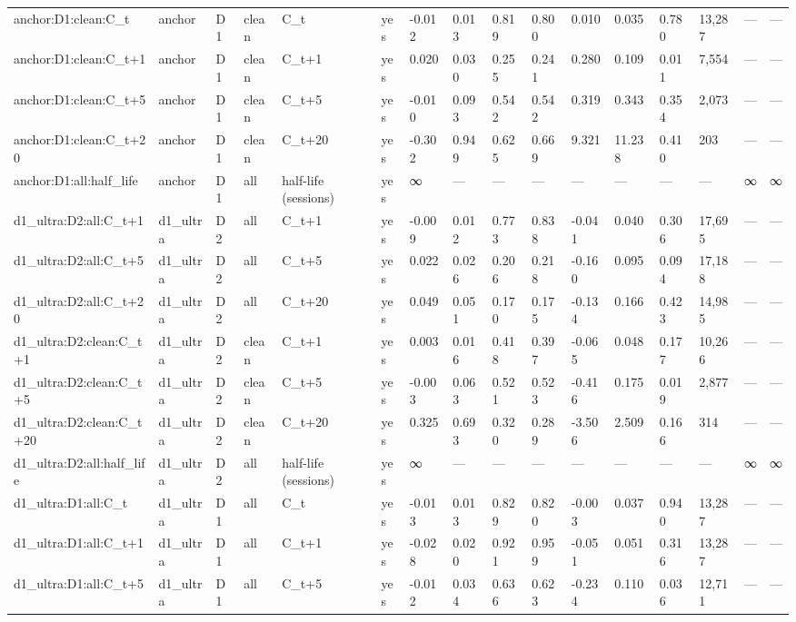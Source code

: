 \begin{tabular}{llllllllllllllll}
anchor:D1:clean:C\_t & anchor & D1 & clean & C\_t & yes & -0.012 & 0.013 & 0.819 & 0.800 & 0.010 & 0.035 & 0.780 & 13,287 & — & — \\
anchor:D1:clean:C\_t+1 & anchor & D1 & clean & C\_t+1 & yes & 0.020 & 0.030 & 0.255 & 0.241 & 0.280 & 0.109 & 0.011 & 7,554 & — & — \\
anchor:D1:clean:C\_t+5 & anchor & D1 & clean & C\_t+5 & yes & -0.010 & 0.093 & 0.542 & 0.542 & 0.319 & 0.343 & 0.354 & 2,073 & — & — \\
anchor:D1:clean:C\_t+20 & anchor & D1 & clean & C\_t+20 & yes & -0.302 & 0.949 & 0.625 & 0.669 & 9.321 & 11.238 & 0.410 & 203 & — & — \\
anchor:D1:all:half\_life & anchor & D1 & all & half-life (sessions) & yes & ∞ & — & — & — & — & — & — & — & ∞ & ∞ \\
d1\_ultra:D2:all:C\_t+1 & d1\_ultra & D2 & all & C\_t+1 & yes & -0.009 & 0.012 & 0.773 & 0.838 & -0.041 & 0.040 & 0.306 & 17,695 & — & — \\
d1\_ultra:D2:all:C\_t+5 & d1\_ultra & D2 & all & C\_t+5 & yes & 0.022 & 0.026 & 0.206 & 0.218 & -0.160 & 0.095 & 0.094 & 17,188 & — & — \\
d1\_ultra:D2:all:C\_t+20 & d1\_ultra & D2 & all & C\_t+20 & yes & 0.049 & 0.051 & 0.170 & 0.175 & -0.134 & 0.166 & 0.423 & 14,985 & — & — \\
d1\_ultra:D2:clean:C\_t+1 & d1\_ultra & D2 & clean & C\_t+1 & yes & 0.003 & 0.016 & 0.418 & 0.397 & -0.065 & 0.048 & 0.177 & 10,266 & — & — \\
d1\_ultra:D2:clean:C\_t+5 & d1\_ultra & D2 & clean & C\_t+5 & yes & -0.003 & 0.063 & 0.521 & 0.523 & -0.416 & 0.175 & 0.019 & 2,877 & — & — \\
d1\_ultra:D2:clean:C\_t+20 & d1\_ultra & D2 & clean & C\_t+20 & yes & 0.325 & 0.693 & 0.320 & 0.289 & -3.506 & 2.509 & 0.166 & 314 & — & — \\
d1\_ultra:D2:all:half\_life & d1\_ultra & D2 & all & half-life (sessions) & yes & ∞ & — & — & — & — & — & — & — & ∞ & ∞ \\
d1\_ultra:D1:all:C\_t & d1\_ultra & D1 & all & C\_t & yes & -0.013 & 0.013 & 0.829 & 0.820 & -0.003 & 0.037 & 0.940 & 13,287 & — & — \\
d1\_ultra:D1:all:C\_t+1 & d1\_ultra & D1 & all & C\_t+1 & yes & -0.028 & 0.020 & 0.921 & 0.959 & -0.051 & 0.051 & 0.316 & 13,287 & — & — \\
d1\_ultra:D1:all:C\_t+5 & d1\_ultra & D1 & all & C\_t+5 & yes & -0.012 & 0.034 & 0.636 & 0.623 & -0.234 & 0.110 & 0.036 & 12,711 & — & — \\

\end{tabular}
